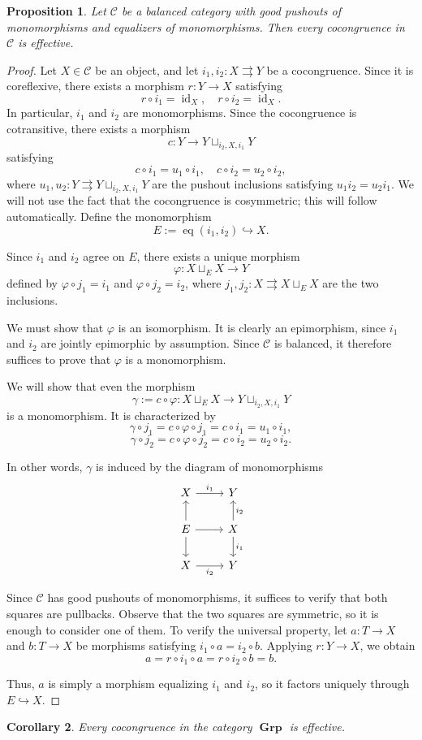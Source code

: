 \documentclass[a4paper,12pt,reqno]{amsart}
\theoremstyle{plain}
\newtheorem{prop}{Proposition}
\newtheorem{cor}[prop]{Corollary}
\theoremstyle{definition}
\DeclareMathOperator{\id}{id}
\DeclareMathOperator{\eq}{eq}
\DeclareMathOperator{\Grp}{\mathbf{Grp}}
\newcommand{\C}{\mathcal{C}}
\begin{document}
\begin{prop}
Let $\C$ be a balanced category with good pushouts of monomorphisms and equalizers of monomorphisms. Then every cocongruence in $\C$ is effective.
\end{prop}

\begin{proof}
Let $X \in \C$ be an object, and let $i_1,i_2 : X \rightrightarrows Y$ be a cocongruence. Since it is coreflexive, there exists a morphism $r : Y \to X$ satisfying
\[r \circ i_1 = \id_X, \quad r \circ i_2 = \id_X.\]
In particular, $i_1$ and $i_2$ are monomorphisms. Since the cocongruence is cotransitive, there exists a morphism
\[c : Y \to Y \sqcup_{i_2,X,i_1} Y\]
satisfying
\[c \circ i_1 = u_1 \circ i_1, \quad c \circ i_2 = u_2 \circ i_2,\]
where $u_1,u_2 : Y \rightrightarrows Y \sqcup_{i_2,X,i_1} Y$ are the pushout inclusions satisfying $u_1 i_2 = u_2 i_1$. We will not use the fact that the cocongruence is cosymmetric; this will follow automatically. Define the monomorphism
\[E := \eq(i_1,i_2) \hookrightarrow X.\]

Since $i_1$ and $i_2$ agree on $E$, there exists a unique morphism
\[\varphi : X \sqcup_E X \to Y\]
defined by $\varphi \circ j_1 = i_1$ and $\varphi \circ j_2 = i_2$, where $j_1,j_2 : X \rightrightarrows X \sqcup_E X$ are the two inclusions.

We must show that $\varphi$ is an isomorphism. It is clearly an epimorphism, since $i_1$ and $i_2$ are jointly epimorphic by assumption. Since $\C$ is balanced, it therefore suffices to prove that $\varphi$ is a monomorphism.

We will show that even the morphism
\[\gamma := c \circ \varphi : X \sqcup_E X \to Y \sqcup_{i_2,X,i_1} Y\]
is a monomorphism. It is characterized by
\[\gamma \circ j_1 = c \circ \varphi \circ j_1 = c \circ i_1 = u_1 \circ i_1,\]
\[\gamma \circ j_2 = c \circ \varphi \circ j_2 = c \circ i_2 = u_2 \circ i_2.\]

In other words, $\gamma$ is induced by the diagram of monomorphisms
\[\begin{tikzcd}
X \ar{r}{i_1} & Y \\
E \ar{r} \ar{u} \ar{d} & X \ar{u}[swap]{i_2} \ar{d}{i_1}  \\
X \ar{r}[swap]{i_2} & Y
\end{tikzcd}\]

Since $\C$ has good pushouts of monomorphisms, it suffices to verify that both squares are pullbacks. Observe that the two squares are symmetric, so it is enough to consider one of them. To verify the universal property, let $a : T \to X$ and $b : T \to X$ be morphisms satisfying $i_1 \circ a = i_2 \circ b$. Applying $r : Y \to X$, we obtain
\[a = r \circ i_1 \circ a = r \circ i_2 \circ b = b.\]

Thus, $a$ is simply a morphism equalizing $i_1$ and $i_2$, so it factors uniquely through $E \hookrightarrow X$.
\end{proof}

\begin{cor}
Every cocongruence in the category $\Grp$ is effective.
\end{cor}
\end{document}
